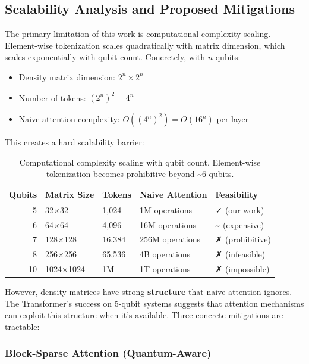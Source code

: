 \documentclass[11pt]{article}
\begin{document}
\subsection{Scalability Analysis and Proposed Mitigations}
\label{sec:org031a5c7}

The primary limitation of this work is computational complexity scaling. Element-wise tokenization scales quadratically with matrix dimension, which scales exponentially with qubit count. Concretely, with \(n\) qubits:

\begin{itemize}
\item Density matrix dimension: \(2^n \times 2^n\)
\item Number of tokens: \((2^n)^2 = 4^n\)
\item Naive attention complexity: \(O((4^n)^2) = O(16^n)\) per layer
\end{itemize}

This creates a hard scalability barrier:

\begin{table}[htbp]
\caption{\label{tab:orgb8435fa}Computational complexity scaling with qubit count. Element-wise tokenization becomes prohibitive beyond \textasciitilde{}6 qubits.}
\centering
\begin{tabular}{rllll}
Qubits & Matrix Size & Tokens & Naive Attention & Feasibility\\
\hline
5 & 32×32 & 1,024 & 1M operations & ✓ (our work)\\
6 & 64×64 & 4,096 & 16M operations & \textasciitilde{} (expensive)\\
7 & 128×128 & 16,384 & 256M operations & ✗ (prohibitive)\\
8 & 256×256 & 65,536 & 4B operations & ✗ (infeasible)\\
10 & 1024×1024 & 1M & 1T operations & ✗ (impossible)\\
\end{tabular}
\end{table}

However, density matrices have strong \textbf{structure} that naive attention ignores. The Transformer's success on 5-qubit systems suggests that attention mechanisms can exploit this structure when it's available. Three concrete mitigations are tractable:
\subsubsection{Block-Sparse Attention (Quantum-Aware)}
\label{sec:org5c589d9}
\end{document}
